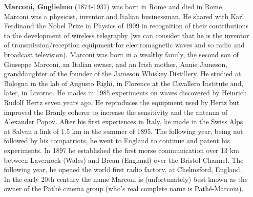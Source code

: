 \textbf{Marconi, Guglielmo} (1874-1937) was born in Rome and died in Rome. Marconi was a physicist, inventor and Italian businessman. He shared with Karl Ferdinand the Nobel Prize in Physics of 1909 in recognition of their contributions to the development of wireless telegraphy (we can consider that he is the inventor of transmission/reception equipment for electromagnetic waves and so radio and broadcast television). Marconi was born in a wealthy family, the second son of Giuseppe Marconi, an Italian owner, and an Irish mother, Annie Jameson, granddaughter of the founder of the Jameson Whiskey Distillery. He studied at Bologna in the lab of Augusto Righi, in Florence at the Cavallero Institute and, later, in Livorno. He mades in 1985 experiments on waves discovered by Heinrich Rudolf Hertz seven years ago. He reproduces the equipment used by Hertz but improved the Branly coherer to increase the sensitivity and the antenna of Alexander Popov. After his first experiences in Italy, he made in the Swiss Alps at Salvan a link of 1.5 km in the summer of 1895. The following year, being not followed by his compatriots, he went to England to continue and patent his experiments. In 1897 he established the first morse communication over 13 km between Lavernock (Wales) and Brean (England) over the Bristol Channel. The following year, he opened the world first radio factory, at Chelmsford, England. In the early 20th century the name Marconi is (unfortunately) best known as the owner of the Pathé cinema group (who's real complete name is Pathé-Marconi).

